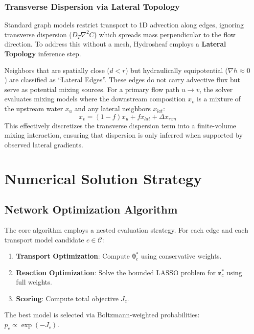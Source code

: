 \documentclass[12pt,a4paper]{article}
\theoremstyle{plain}
\theoremstyle{definition}
\theoremstyle{remark}
\begin{document}
\subsubsection{Transverse Dispersion via Lateral Topology}
Standard graph models restrict transport to 1D advection along edges, ignoring transverse dispersion ($D_T \nabla^2 C$) which spreads mass perpendicular to the flow direction. To address this without a mesh, Hydrosheaf employs a \textbf{Lateral Topology} inference step.

Neighbors that are spatially close ($d < r$) but hydraulically equipotential ($\nabla h \approx 0$) are classified as ``Lateral Edges''. These edges do not carry advective flux but serve as potential mixing sources. For a primary flow path $u \to v$, the solver evaluates mixing models where the downstream composition $x_v$ is a mixture of the upstream water $x_u$ and any lateral neighbors $x_{lat}$:
\begin{equation}
	x_v = (1-f) x_u + f x_{lat} + \Delta x_{rxn}
\end{equation}
This effectively discretizes the transverse dispersion term into a finite-volume mixing interaction, ensuring that dispersion is only inferred when supported by observed lateral gradients.

\newpage

\section{Numerical Solution Strategy}\label{sec:numerical_solution}

\subsection{Network Optimization Algorithm}\label{sec:network_optimization}
The core algorithm employs a nested evaluation strategy. For each edge and each transport model candidate $c \in \mathcal{C}$:
\begin{enumerate}
	\item \textbf{Transport Optimization}: Compute $\boldsymbol{\theta}_c^*$ using conservative weights.
	\item \textbf{Reaction Optimization}: Solve the bounded LASSO problem for $\mathbf{z}_c^*$ using full weights.
	\item \textbf{Scoring}: Compute total objective $J_c$.
\end{enumerate}
The best model is selected via Boltzmann-weighted probabilities: $p_c \propto \exp(-J_c)$.
\end{document}
